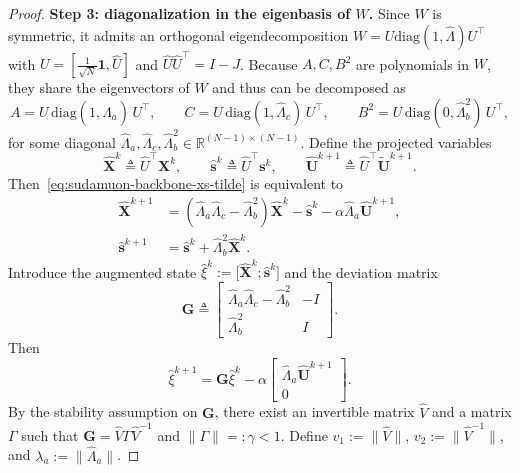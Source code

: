 \documentclass[10pt,a4paper]{amsart}
\newcommand{\G}{\mathbf{G}}
\begin{document}
\begin{proof}
\medskip\noindent\textbf{Step 3: diagonalization in the eigenbasis of $W$.}
Since $W$ is symmetric, it admits an orthogonal eigendecomposition
$W=U\mathrm{diag}(1,\hat\Lambda)U^\top$ with $U=[\tfrac{1}{\sqrt N}\mathbf 1,\hat U]$ and $\hat U\hat U^\top=I-J$.
Because $A,C,B^2$ are polynomials in $W$, they share the eigenvectors of $W$ and thus can be decomposed as
\[
A = U\,\mathrm{diag}(1,\hat\Lambda_a)\,U^\top,\qquad
C = U\,\mathrm{diag}(1,\hat\Lambda_c)\,U^\top,\qquad
B^2 = U\,\mathrm{diag}(0,\hat\Lambda_b^2)\,U^\top,
\]
for some diagonal $\hat\Lambda_a,\hat\Lambda_c,\hat\Lambda_b^2\in\mathbb{R}^{(N-1)\times(N-1)}$.
Define the projected variables
\[
\hat{\mathbf X}^k \triangleq \hat U^\top\mathbf X^k,\qquad
\hat{\mathbf s}^k \triangleq \hat U^\top\mathbf s^k,
\qquad
\hat{\mathbf U}^{k+1}\triangleq \hat U^\top\tilde{\mathbf U}^{k+1}.
\]
Then~\eqref{eq:sudamuon-backbone-xs-tilde} is equivalent to
\begin{subequations}
\label{eq:sudamuon-backbone-projected}
\begin{align}
\hat{\mathbf X}^{k+1}
&= (\hat\Lambda_a\hat\Lambda_c-\hat\Lambda_b^2)\hat{\mathbf X}^k - \hat{\mathbf s}^k - \alpha\hat\Lambda_a\hat{\mathbf U}^{k+1},\\
\hat{\mathbf s}^{k+1}
&= \hat{\mathbf s}^k + \hat\Lambda_b^2\hat{\mathbf X}^k.
\end{align}
\end{subequations}
Introduce the augmented state $\hat\xi^k:=\bigl[\hat{\mathbf X}^k;\hat{\mathbf s}^k\bigr]$ and the deviation matrix
\[
\G\triangleq
\begin{bmatrix}
\hat\Lambda_a\hat\Lambda_c-\hat\Lambda_b^2 & -I\\
\hat\Lambda_b^2 & I
\end{bmatrix}.
\]
Then
\begin{equation}
\label{eq:sudamuon-backbone-xi-rec}
\hat\xi^{k+1}=\G\hat\xi^k-\alpha\begin{bmatrix}\hat\Lambda_a\hat{\mathbf U}^{k+1}\\0\end{bmatrix}.
\end{equation}
By the stability assumption on $\G$, there exist an invertible matrix $\hat V$ and a matrix $\Gamma$ such that
$\G=\hat V\Gamma\hat V^{-1}$ and $\|\Gamma\|=: \gamma<1$.
Define $v_1:=\|\hat V\|$, $v_2:=\|\hat V^{-1}\|$, and $\lambda_a:=\|\hat\Lambda_a\|$.


\end{proof}
\end{document}
